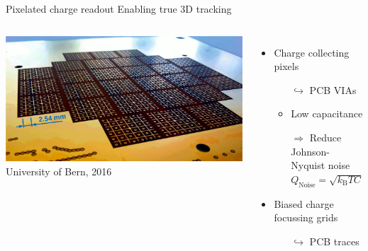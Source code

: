\documentclass[]{beamer}
\newcommand*{\m}{\mathrm}
\newcommand*{\emphcol}{blue}
\begin{document}
\begin{frame}{Pixelated charge readout}{\color{\emphcol} Enabling true 3D tracking}
	\begin{columns}[c]
		\centering
		\includegraphics[width=\textwidth]{viper/pixies}\\
		{\tiny University of Bern, 2016}\\
		\begin{itemize}
			\item Charge collecting pixels
			\begin{itemize}
				\item[$\hookrightarrow$] PCB VIAs
				\item Low capacitance
				\item[$\Rightarrow$] Reduce Johnson-Nyquist noise $Q_{\m{Noise}} = \sqrt{k_{\m{B}}TC}$
			\end{itemize}
			\item Biased charge focussing grids
			\begin{itemize}
				\item[$\hookrightarrow$] PCB traces
			\end{itemize}
		\end{itemize}
	\end{columns}
\end{frame}
\end{document}
